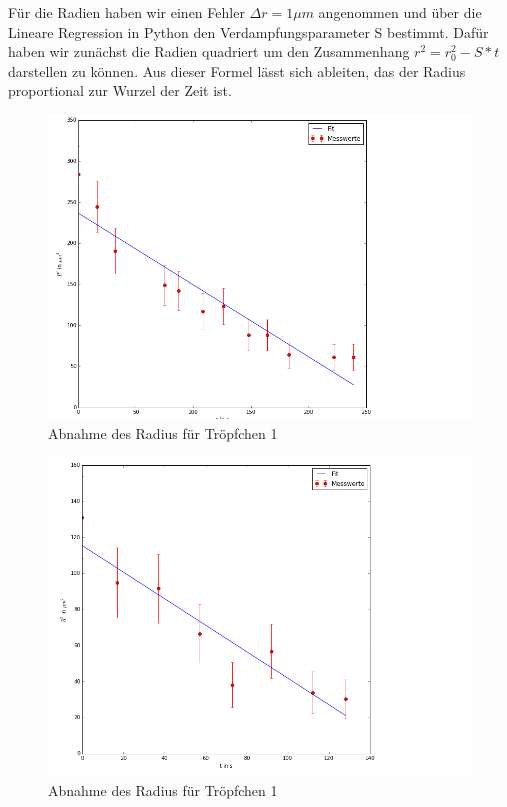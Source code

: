 \documentclass[10pt,a4paper]{article}
\begin{document}
Für die Radien haben wir einen Fehler $\Delta r = 1\mu m$ angenommen und über die Lineare Regression in Python den Verdampfungsparameter S bestimmt. Dafür haben wir zunächst die Radien quadriert um den Zusammenhang $r^{2} = r_{0}^{2} - S*t$ darstellen zu können. Aus dieser Formel lässt sich ableiten, das der Radius proportional zur Wurzel der Zeit ist.
\begin{figure}[h]
	\includegraphics[scale = 0.5]{Graph1.png}
	\centering
	\caption{Abnahme des Radius für Tröpfchen 1}
	\label{optical_cavities}
\end{figure}
\begin{figure}[h]
	\includegraphics[scale = 0.5]{Graph2.png}
	\centering
	\caption{Abnahme des Radius für Tröpfchen 1}
	\label{optical_cavities}
\end{figure}
\end{document}
